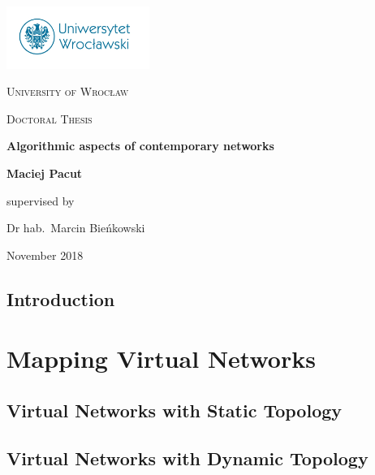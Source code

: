 \documentclass[a4paper,11pt]{book}
\author{Maciej Pacut}
\begin{document}
\begin{titlepage}
	\centering
	\includegraphics[width=0.35\textwidth]{figs/uni-logo.jpg}\par\vspace{1cm}
	{\scshape\LARGE University of Wrocław\par}
	\vspace{3cm}
        {\scshape\Large Doctoral Thesis\par}
	\vspace{1cm}
        {\huge\bfseries Algorithmic aspects of contemporary networks\par}
	\vspace{3cm}
        {\huge \bfseries Maciej Pacut\par}
	\vfill
	supervised by\par
	Dr hab.~Marcin Bieńkowski

	\vfill

	{\large November 2018 \par}
\end{titlepage}

\newpage
\thispagestyle{empty}
\mbox{}

\tableofcontents


\chapter{Introduction}



\part{Mapping Virtual Networks}
\label{pt:virtual-networks}

\chapter{Virtual Networks with Static Topology}
\label{ch:static-mapping}



\chapter{Virtual Networks with Dynamic Topology}
\label{ch:dynamic-mapping}
\end{document}

